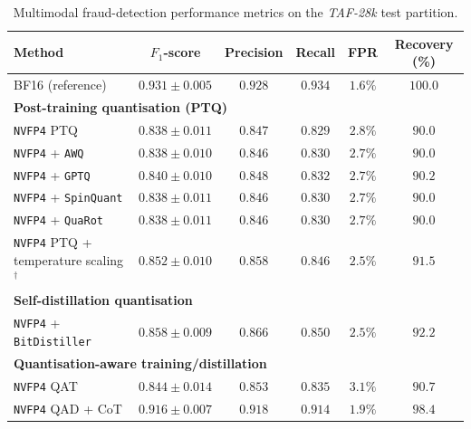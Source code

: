 \documentclass[a4paper,fleqn]{cas-sc}
\begin{document}
\begin{table}[t]
\centering
\caption{Multimodal fraud-detection performance metrics on the \textit{TAF-28k} test partition.}
\label{tab3-en}
\small
\renewcommand{\arraystretch}{1.15}
\begin{tabularx}{\textwidth}{Xccccc}
\toprule
\textbf{Method} &
\textbf{$F_1$-score} &
\textbf{Precision} &
\textbf{Recall} &
\textbf{FPR} &
\textbf{Recovery (\%)} \\
\midrule

BF16 (reference) &
$0.931 \pm 0.005$ &
$0.928$ &
$0.934$ &
$1.6\%$ &
$100.0$ \\

\midrule
\multicolumn{6}{l}{\textbf{Post-training quantisation (PTQ)}} \\

\texttt{NVFP4} PTQ &
$0.838 \pm 0.011$ &
$0.847$ &
$0.829$ &
$2.8\%$ &
$90.0$ \\

\texttt{NVFP4} + \texttt{AWQ} &
$0.838 \pm 0.010$ &
$0.846$ &
$0.830$ &
$2.7\%$ &
$90.0$ \\

\texttt{NVFP4} + \texttt{GPTQ} &
$0.840 \pm 0.010$ &
$0.848$ &
$0.832$ &
$2.7\%$ &
$90.2$ \\

\texttt{NVFP4} + \texttt{SpinQuant} &
$0.838 \pm 0.011$ &
$0.846$ &
$0.830$ &
$2.7\%$ &
$90.0$ \\

\texttt{NVFP4} + \texttt{QuaRot} &
$0.838 \pm 0.011$ &
$0.846$ &
$0.830$ &
$2.7\%$ &
$90.0$ \\

\texttt{NVFP4} PTQ + temperature scaling$^{\dagger}$ &
$0.852 \pm 0.010$ &
$0.858$ &
$0.846$ &
$2.5\%$ &
$91.5$ \\

\midrule
\multicolumn{6}{l}{\textbf{Self-distillation quantisation}} \\

\texttt{NVFP4} + \texttt{BitDistiller} &
$0.858 \pm 0.009$ &
$0.866$ &
$0.850$ &
$2.5\%$ &
$92.2$ \\

\midrule
\multicolumn{6}{l}{\textbf{Quantisation-aware training/distillation}} \\

\texttt{NVFP4} QAT &
$0.844 \pm 0.014$ &
$0.853$ &
$0.835$ &
$3.1\%$ &
$90.7$ \\

\texttt{NVFP4} QAD + CoT &
$0.916 \pm 0.007$ &
$0.918$ &
$0.914$ &
$1.9\%$ &
$98.4$ \\


\end{tabularx}
\end{table}
\end{document}
